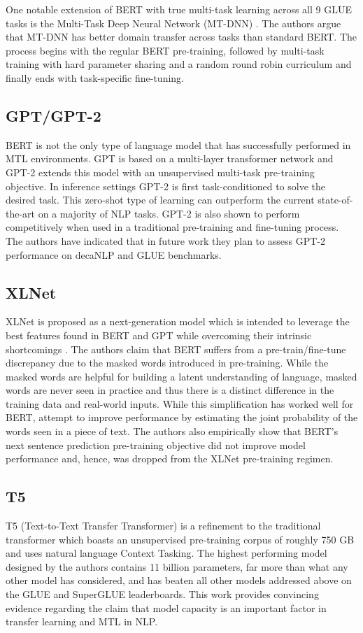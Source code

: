 \documentclass[twocolumn]{article}
\begin{document}
One notable extension of BERT with true multi-task learning across all 9 GLUE tasks is the Multi-Task Deep Neural Network (MT-DNN) \citep{mtdnn19}. The authors argue that MT-DNN has better domain transfer across tasks than standard BERT. The process begins with the regular BERT pre-training, followed by multi-task training with hard parameter sharing and a random round robin curriculum and finally ends with task-specific fine-tuning.

\subsection{GPT/GPT-2}
BERT is not the only type of language model that has successfully performed in MTL environments. GPT \citep{gpt18} is based on a multi-layer transformer network and GPT-2 \citep{gpt19} extends this model with an unsupervised multi-task pre-training objective. In inference settings GPT-2 is first task-conditioned to solve the desired task. This zero-shot type of learning can outperform the current state-of-the-art on a majority of NLP tasks. GPT-2 is also shown to perform competitively when used in a traditional pre-training and fine-tuning process. The authors have indicated that in future work they plan to assess GPT-2 performance on decaNLP and GLUE benchmarks.

\subsection{XLNet}
XLNet is proposed as a next-generation model which is intended to leverage the best features found in BERT and GPT while overcoming their intrinsic shortcomings \citep{xlnet19}. The authors claim that BERT suffers from a pre-train/fine-tune discrepancy due to the masked words introduced in pre-training. While the masked words are helpful for building a latent understanding of language, masked words are never seen in practice and thus there is a distinct difference in the training data and real-world inputs. While this simplification has worked well for BERT, \cite{xlnet19} attempt to improve performance by estimating the joint probability of the words seen in a piece of text. The authors also empirically show that BERT's next sentence prediction pre-training objective did not improve model performance and, hence, was dropped from the XLNet pre-training regimen.

\subsection{T5}
T5 \citep{t519} (Text-to-Text Transfer Transformer) is a refinement to the traditional transformer which boasts an unsupervised pre-training corpus of roughly 750 GB and uses natural language Context Tasking. The highest performing model designed by the authors contains 11 billion parameters, far more than what any other model has considered, and has beaten all other models addressed above on the GLUE and SuperGLUE leaderboards. This work provides convincing evidence regarding the claim that model capacity is an important factor in transfer learning and MTL in NLP.
\end{document}
